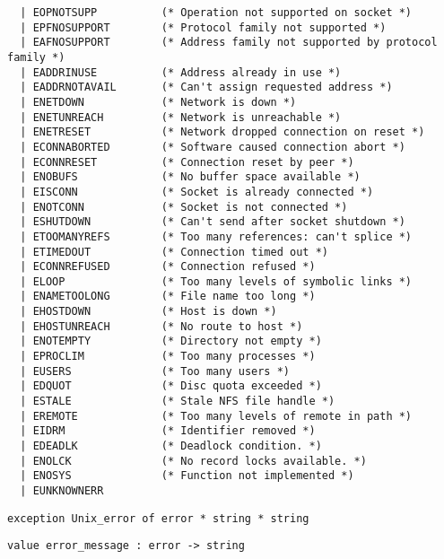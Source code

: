 \begin{verbatim}
  | EOPNOTSUPP          (* Operation not supported on socket *)
  | EPFNOSUPPORT        (* Protocol family not supported *)
  | EAFNOSUPPORT        (* Address family not supported by protocol family *)
  | EADDRINUSE          (* Address already in use *)
  | EADDRNOTAVAIL       (* Can't assign requested address *)
  | ENETDOWN            (* Network is down *)
  | ENETUNREACH         (* Network is unreachable *)
  | ENETRESET           (* Network dropped connection on reset *)
  | ECONNABORTED        (* Software caused connection abort *)
  | ECONNRESET          (* Connection reset by peer *)
  | ENOBUFS             (* No buffer space available *)
  | EISCONN             (* Socket is already connected *)
  | ENOTCONN            (* Socket is not connected *)
  | ESHUTDOWN           (* Can't send after socket shutdown *)
  | ETOOMANYREFS        (* Too many references: can't splice *)
  | ETIMEDOUT           (* Connection timed out *)
  | ECONNREFUSED        (* Connection refused *)
  | ELOOP               (* Too many levels of symbolic links *)
  | ENAMETOOLONG        (* File name too long *)
  | EHOSTDOWN           (* Host is down *)
  | EHOSTUNREACH        (* No route to host *)
  | ENOTEMPTY           (* Directory not empty *)
  | EPROCLIM            (* Too many processes *)
  | EUSERS              (* Too many users *)
  | EDQUOT              (* Disc quota exceeded *)
  | ESTALE              (* Stale NFS file handle *)
  | EREMOTE             (* Too many levels of remote in path *)
  | EIDRM               (* Identifier removed *)
  | EDEADLK             (* Deadlock condition. *)
  | ENOLCK              (* No record locks available. *)
  | ENOSYS              (* Function not implemented *)
  | EUNKNOWNERR
\end{verbatim}
\begin{comment}
 The type of error codes. 
\end{comment}
\begin{verbatim}
exception Unix_error of error * string * string
\end{verbatim}
%
\begin{comment}
 Raised by the system calls below when an error is encountered.
           The first component is the error code; the second component
           is the function name; the third component is the string parameter
           to the function, if it has one, or the empty string otherwise. 
\end{comment}
\begin{verbatim}
value error_message : error -> string
\end{verbatim}

